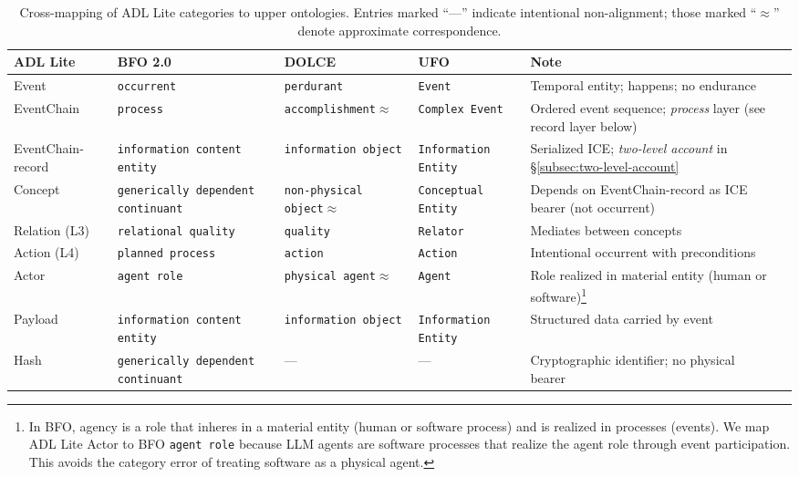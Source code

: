\begin{table}[htbp]
\centering
\small
\caption{Cross-mapping of ADL Lite categories to upper ontologies. Entries marked ``---'' indicate intentional non-alignment; those marked ``\texorpdfstring{$\approx$}{~}'' denote approximate correspondence.}
\label{tab:upper-ontology-mapping}
\begin{tabularx}{\textwidth}{@{}p{1.4cm}p{2.5cm}XXXX@{}}
\toprule
\textbf{ADL Lite} & \textbf{BFO 2.0} & \textbf{DOLCE} & \textbf{UFO} & \textbf{Note} \\
\midrule
Event & \texttt{occurrent} & \texttt{perdurant} & \texttt{Event} & Temporal entity; happens; no endurance \\
EventChain & \texttt{process} & \texttt{accomplishment}$\approx$ & \texttt{Complex Event} & Ordered event sequence; \emph{process} layer (see record layer below) \\
EventChain-record & \texttt{information content entity} & \texttt{information object} & \texttt{Information Entity} & Serialized ICE; \emph{two-level account} in \S\ref{subsec:two-level-account} \\
Concept & \texttt{generically dependent continuant} & \texttt{non-physical object}$\approx$ & \texttt{Conceptual Entity} & Depends on EventChain-record as ICE bearer (not occurrent) \\
Relation (L3) & \texttt{relational quality} & \texttt{quality} & \texttt{Relator} & Mediates between concepts \\
Action (L4) & \texttt{planned process} & \texttt{action} & \texttt{Action} & Intentional occurrent with preconditions \\
Actor & \texttt{agent role} & \texttt{physical agent}$\approx$ & \texttt{Agent} & Role realized in material entity (human or software)\footnote{In BFO, agency is a role that inheres in a material entity (human or software process) and is realized in processes (events). We map ADL Lite Actor to BFO \texttt{agent role} because LLM agents are software processes that realize the agent role through event participation. This avoids the category error of treating software as a physical agent.} \\
Payload & \texttt{information content entity} & \texttt{information object} & \texttt{Information Entity} & Structured data carried by event \\
Hash & \texttt{generically dependent continuant} & --- & --- & Cryptographic identifier; no physical bearer \\
\bottomrule
\end{tabularx}
\end{table}

